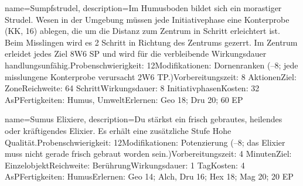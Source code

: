 {
    name={Sumpfstrudel},
    description={Im Humusboden bildet sich ein morastiger Strudel. Wesen in der Umgebung müssen jede Initiativephase eine Konterprobe (KK, 16) ablegen, die um die Distanz zum Zentrum in Schritt erleichtert ist. Beim Misslingen wird es 2 Schritt in Richtung des Zentrums gezerrt. Im Zentrum erleidet jedes Ziel 8W6 SP und wird für die verbleibende Wirkungsdauer handlungsunfähig.\newline Probenschwierigkeit: 12\newline Modifikationen: Dornenranken (–8; jede misslungene Konterprobe verursacht 2W6 TP.)\newline Vorbereitungszeit: 8 Aktionen\newline Ziel: Zone\newline Reichweite: 64 Schritt\newline Wirkungsdauer: 8 Initiativphasen\newline Kosten: 32 AsP\newline Fertigkeiten: Humus, Umwelt\newline Erlernen: Geo 18; Dru 20; 60 EP}
}


{
    name={Sumus Elixiere},
    description={Du stärkst ein frisch gebrautes, heilendes oder kräftigendes Elixier. Es erhält eine zusätzliche Stufe Hohe Qualität.\newline Probenschwierigkeit: 12\newline Modifikationen: Potenzierung (–8; das Elixier muss nicht gerade frisch gebraut worden sein.)\newline Vorbereitungszeit: 4 Minuten\newline Ziel: Einzelobjekt\newline Reichweite: Berührung\newline Wirkungsdauer: 1 Tag\newline Kosten: 4 AsP\newline Fertigkeiten: Humus\newline Erlernen: Geo 14; Alch, Dru 16; Hex 18; Mag 20; 20 EP}
}



